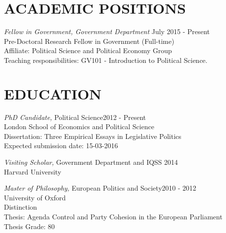 \documentclass[line,margin]{res}
\begin{document}
\address{j.blumenau@lse.ac.uk, 0207 955 6984\\ \url{http://www.jackblumenau.com}}%
 
\begin{resume}

\section{ACADEMIC POSITIONS} 
{\sl Fellow in Government, Government Department} \hfill July 2015 - Present\\
Pre-Doctoral Research Fellow in Government (Full-time) \\
Affiliate: Political Science and Political Economy Group\\
Teaching responsibilities: GV101 - Introduction to Political Science.

\section{EDUCATION} 

		{\sl PhD Candidate,} Political Science\hfill 2012 - Present\\
                London School of Economics and Political Science\\
                Dissertation: Three Empirical Essays in Legislative Politics\\
                Expected submission date: 15-03-2016        

		{\sl Visiting Scholar,} Government Department and IQSS \hfill  2014\\
                 Harvard University\   

					{\sl Master of Philosophy,} European Politics and Society\hfill 2010 - 2012 \\
                University of Oxford\\ 
                Distinction \\
                Thesis: Agenda Control and Party Cohesion in the European Parliament\\
				Thesis Grade: 80


\end{resume}
\end{document}
